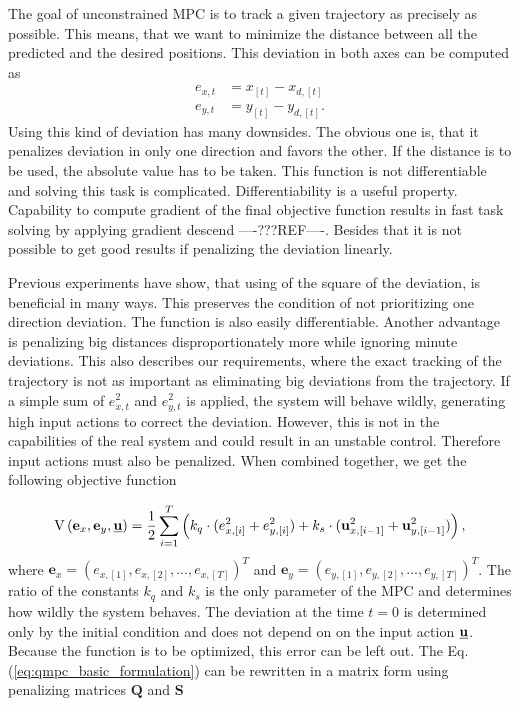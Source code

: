 \documentclass[a4paper,11pt,titlepage]{article}
\newcommand{\uvec}{\textbf{\underline{u}}}
\begin{document}
The goal of unconstrained MPC is to track a given trajectory as precisely as possible. This means, that we want to minimize the distance between all the predicted and the desired positions. This deviation in both axes can be computed as
\begin{equation}
\begin{split}
\label{eq:simple_err}
e_{x, t} &= x_{[t]} - x_{d, [t]}\\
e_{y, t} &= y_{[t]} - y_{d, [t]}.
\end{split}
\end{equation}
Using this kind of deviation has many downsides. The obvious one is, that it penalizes deviation in only one direction and favors the other. If the distance is to be used, the absolute value has to be taken. This function is not differentiable \cite{stein1970singular} and solving this task is complicated. Differentiability is a useful property. Capability to compute gradient of the final objective function results in fast task solving by applying gradient descend ----???REF----. Besides that it is not possible to get good results if penalizing the deviation linearly. 

Previous experiments have show, that using of the square of the deviation, is beneficial in many ways. This preserves the condition of not prioritizing one direction deviation. The function is also easily differentiable. Another advantage is penalizing big distances disproportionately more while ignoring minute deviations. This also describes our requirements, where the exact tracking of the trajectory is not as important as eliminating big deviations from the trajectory. If a simple sum of $e_{x, t}^2$ and $e_{y, t}^2$ is applied, the system will behave wildly, generating high input actions to correct the deviation. However, this is not in the capabilities of the real system and could result in an unstable control. Therefore input actions must also be penalized. When combined together, we get the following objective function 

\begin{equation}
\label{eq:qmpc_basic_formulation}
\mathrm{V}\left(\textbf{e}_x, \textbf{e}_y, \uvec\right) 
= \frac{1}{2}\sum_{i=1}^{T}\left( k_q \cdot (e^2_{x, [i]}+e^2_{y, [i]}) + k_s \cdot (\textbf{u}^2_{x, [i-1]}+\textbf{u}^2_{y, [i-1]})\right),
\end{equation}
where $\textbf{e}_x = (e_{x, [1]}, e_{x, [2]}, ..., e_{x, [T]})^T$ and $\textbf{e}_y = (e_{y, [1]}, e_{y, [2]}, ..., e_{y, [T]})^T$. The ratio of the constants $k_q$ and $k_s$ is the only parameter of the MPC and determines how wildly the system behaves. The deviation at the time $t = 0$ is determined only by the initial condition and does not depend on on the input action $\uvec$. Because the function is to be optimized, this error can be left out. The Eq. (\ref{eq:qmpc_basic_formulation}) can be rewritten in a matrix form using penalizing matrices $\textbf{Q}$ and $\textbf{S}$
\end{document}
